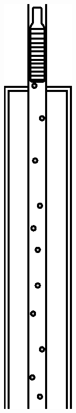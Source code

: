 \begin{figure}[htbp]
    {\centering \includegraphics[height=.3\textheight]{fig/foamer/plunger-conventional/conventionalplunger-C.eps} \label{fig:plunger-conventional-C}} \qquad \qquad
    \subfloat[][]

\end{figure}
